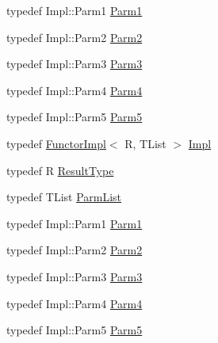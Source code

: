 \begin{DoxyCompactItemize}
\item 
typedef Impl\+::\+Parm1 \mbox{\hyperlink{classUtil_1_1ObjectFunctor_a199715d28029627c2ae7219c13b04d26}{Parm1}}
\item 
typedef Impl\+::\+Parm2 \mbox{\hyperlink{classUtil_1_1ObjectFunctor_a6809cf65883dc7575e01d9b9849649cf}{Parm2}}
\item 
typedef Impl\+::\+Parm3 \mbox{\hyperlink{classUtil_1_1ObjectFunctor_a6becd26610c6091b9ba93cd96f3def66}{Parm3}}
\item 
typedef Impl\+::\+Parm4 \mbox{\hyperlink{classUtil_1_1ObjectFunctor_a54ce0b64981cd7f558ce8eea7df3f1b2}{Parm4}}
\item 
typedef Impl\+::\+Parm5 \mbox{\hyperlink{classUtil_1_1ObjectFunctor_a8428e04dd3fb91bc7f7c518a1771eecb}{Parm5}}
\item 
typedef \mbox{\hyperlink{classUtil_1_1FunctorImpl}{Functor\+Impl}}$<$ R, T\+List $>$ \mbox{\hyperlink{classUtil_1_1ObjectFunctor_a93fc635194d1d2768e73ba87d03abd8d}{Impl}}
\item 
typedef R \mbox{\hyperlink{classUtil_1_1ObjectFunctor_a77f816e98108848347d0dfc085090a1c}{Result\+Type}}
\item 
typedef T\+List \mbox{\hyperlink{classUtil_1_1ObjectFunctor_ae0ad0a2f4b9f3a67014d4fc237df3c99}{Parm\+List}}
\item 
typedef Impl\+::\+Parm1 \mbox{\hyperlink{classUtil_1_1ObjectFunctor_a199715d28029627c2ae7219c13b04d26}{Parm1}}
\item 
typedef Impl\+::\+Parm2 \mbox{\hyperlink{classUtil_1_1ObjectFunctor_a6809cf65883dc7575e01d9b9849649cf}{Parm2}}
\item 
typedef Impl\+::\+Parm3 \mbox{\hyperlink{classUtil_1_1ObjectFunctor_a6becd26610c6091b9ba93cd96f3def66}{Parm3}}
\item 
typedef Impl\+::\+Parm4 \mbox{\hyperlink{classUtil_1_1ObjectFunctor_a54ce0b64981cd7f558ce8eea7df3f1b2}{Parm4}}
\item 
typedef Impl\+::\+Parm5 \mbox{\hyperlink{classUtil_1_1ObjectFunctor_a8428e04dd3fb91bc7f7c518a1771eecb}{Parm5}}
\end{DoxyCompactItemize}
